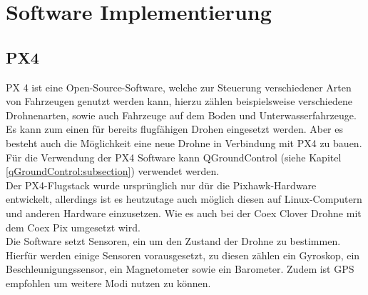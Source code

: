 \chapter{Software Implementierung}

\section{PX4} \label{px4:subsection}
PX 4 ist eine Open-Source-Software, welche zur Steuerung verschiedener Arten von Fahrzeugen genutzt werden kann, hierzu zählen beispielsweise verschiedene Drohnenarten, sowie auch Fahrzeuge auf dem Boden und Unterwasserfahrzeuge.\\ Es kann zum einen für bereits flugfähigen Drohen eingesetzt werden. Aber es besteht auch die Möglichkeit eine neue Drohne in Verbindung mit PX4 zu bauen.\\
Für die Verwendung der PX4 Software kann QGroundControl (siehe Kapitel \ref{qGroundControl:subsection}) verwendet werden. \cite[vgl.][]{px4} \\
Der PX4-Flugstack wurde ursprünglich nur dür die Pixhawk-Hardware entwickelt, allerdings ist es heutzutage auch möglich diesen auf Linux-Computern und anderen Hardware einzusetzen. Wie es auch bei der Coex Clover Drohne mit dem Coex Pix umgesetzt wird. \\
Die Software setzt Sensoren, ein um den Zustand der Drohne zu bestimmen. Hierfür werden einige Sensoren vorausgesetzt, zu diesen zählen ein Gyroskop, ein Beschleunigungssensor, ein Magnetometer sowie ein Barometer. Zudem ist GPS empfohlen um weitere Modi nutzen zu können. \cite[vgl.][]{px4}

